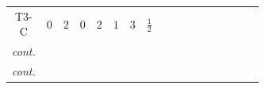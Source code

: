 \documentclass[8pt]{article}
\begin{document}
\begin{landscape}
\begin{longtable}{@{}cccccccc >{\raggedright\arraybackslash}p{0.21\linewidth} >{\raggedright\arraybackslash}p{0.21\linewidth} >{\raggedright\arraybackslash}p{0.21\linewidth}@{}}
T3-C & $0$ & $2$ & $0$ & $2$ & $1$ & $3$ & $\frac{1}{2}$ & \scriptsize\adjustbox{max width=\linewidth}{$\begin{gathered} +\frac{\hbar  H_{a_1} H_{a_2} H_{a_1}{}^{\dagger } H_{a_2}{}^{\dagger } \left(\lambda_{H1}^{(1)}\right){}^2}{2 \epsilon } \\ +\frac{5 \hbar  H_{a_1} H_{a_2} H_{a_1}{}^{\dagger } H_{a_2}{}^{\dagger } \left(\lambda_{H1}^{(2)}\right){}^2}{6 \epsilon } \\ +\frac{\hbar  H_{a_1} H_{a_2} H_{a_1}{}^{\dagger } H_{a_2}{}^{\dagger } \left(\lambda_{H2}^{(1)}\right){}^2}{2 \epsilon }\end{gathered}$} & \scriptsize\adjustbox{max width=\linewidth}{$\begin{gathered} -\frac{11 \hbar  B_{\mu _1\mu _2}^2}{12 \epsilon }\end{gathered}$} & \scriptsize\adjustbox{max width=\linewidth}{$\begin{gathered} -\frac{25 \hbar  \left(W_{\mu _1\mu _2}^{A_1}\right){}^2}{12 \epsilon }\end{gathered}$} \\
\textit{cont.} &  &  &  &  &  &  &  & \scriptsize\adjustbox{max width=\linewidth}{$\begin{gathered} +\frac{5 \hbar  H_{a_1} H_{a_2} H_{a_1}{}^{\dagger } H_{a_2}{}^{\dagger } \left(\lambda_{H2}^{(2)}\right){}^2}{6 \epsilon } \\ +C_{\text{H2}} H_{a_1} H_{a_1}{}^{\dagger } \\ -H_{a_1} \mu ^2 H_{a_1}{}^{\dagger }\end{gathered}$} &  &  \\
\textit{cont.} &  &  &  &  &  &  &  & \scriptsize\adjustbox{max width=\linewidth}{$\begin{gathered} +\frac{4 \hbar  \overline{\lambda_{T3}} H_{a_1} H_{a_2} \lambda_{T3} H_{a_1}{}^{\dagger } H_{a_2}{}^{\dagger }}{3 \epsilon } \\ +\frac{\hbar  H_{a_1} H_{a_2} H_{a_1}{}^{\dagger } H_{a_2}{}^{\dagger } \lambda_{H1}^{(1)} \lambda_{H1}^{(2)}}{\sqrt{3} \epsilon } \\ +\frac{\hbar  H_{a_1} H_{a_2} H_{a_1}{}^{\dagger } H_{a_2}{}^{\dagger } \lambda_{H2}^{(1)} \lambda_{H2}^{(2)}}{\sqrt{3} \epsilon }\end{gathered}$} &  &  \\
\midrule

\end{longtable}
\end{landscape}
\end{document}
